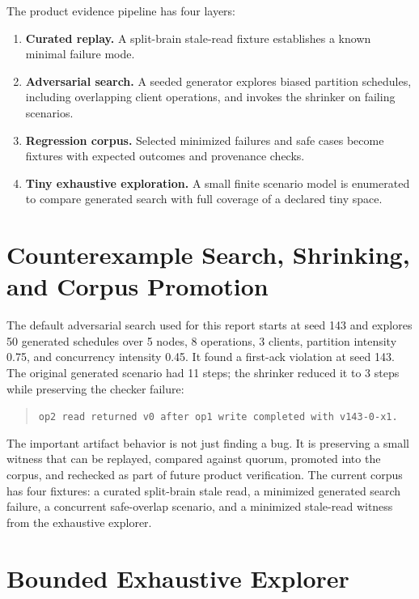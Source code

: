 \documentclass[10pt]{article}
\newcommand{\firstack}{first-ack}
\newcommand{\quorum}{quorum}
\begin{document}
The product evidence pipeline has four layers:

\begin{enumerate}
  \item \textbf{Curated replay.} A split-brain stale-read fixture establishes a known minimal
  failure mode.
  \item \textbf{Adversarial search.} A seeded generator explores biased partition schedules,
  including overlapping client operations, and invokes the shrinker on failing scenarios.
  \item \textbf{Regression corpus.} Selected minimized failures and safe cases become fixtures
  with expected outcomes and provenance checks.
  \item \textbf{Tiny exhaustive exploration.} A small finite scenario model is enumerated to
  compare generated search with full coverage of a declared tiny space.
\end{enumerate}

\section{Counterexample Search, Shrinking, and Corpus Promotion}

The default adversarial search used for this report starts at seed 143 and explores 50 generated
schedules over 5 nodes, 8 operations, 3 clients, partition intensity 0.75, and concurrency
intensity 0.45. It found a \firstack{} violation at seed 143. The original generated scenario had
11 steps; the shrinker reduced it to 3 steps while preserving the checker failure:

\begin{quote}
\texttt{op2 read returned v0 after op1 write completed with v143-0-x1.}
\end{quote}

The important artifact behavior is not just finding a bug. It is preserving a small witness that
can be replayed, compared against \quorum{}, promoted into the corpus, and rechecked as part of
future product verification. The current corpus has four fixtures: a curated split-brain stale
read, a minimized generated search failure, a concurrent safe-overlap scenario, and a minimized
stale-read witness from the exhaustive explorer.

\section{Bounded Exhaustive Explorer}
\end{document}
